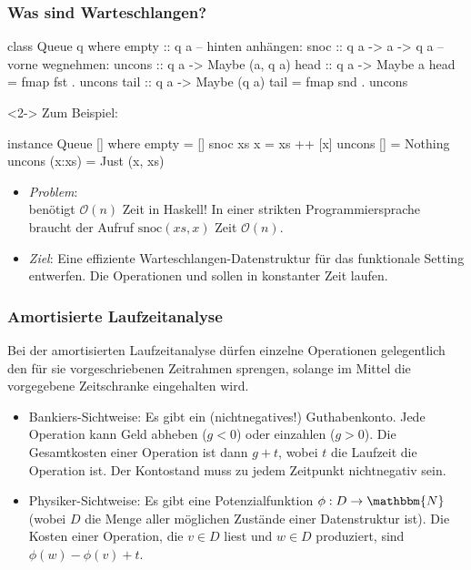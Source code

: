 \documentclass{beamer}
\renewcommand{\O}{\mathcal{O}} %
\newcommand{\N}{\mathbbm{N}} %
\begin{document}
\begin{frame}[fragile]
  \frametitle{Was sind Warteschlangen?}
  \begin{minipage}[t]{0.57 \linewidth}
\begin{haskellcode}
class Queue q where
  empty  :: q a
  -- hinten anhängen:
  snoc   :: q a -> a -> q a
  -- vorne wegnehmen:
  uncons :: q a -> Maybe (a, q a)
  head :: q a -> Maybe a
  head = fmap fst . uncons
  tail :: q a -> Maybe (q a)
  tail = fmap snd . uncons
\end{haskellcode}
  \end{minipage}
  \begin{minipage}[t]{0.4 \linewidth}
    \begin{visibleenv}<2->
    Zum Beispiel:
\begin{haskellcode}
instance Queue [] where
  empty = []
  snoc xs x = xs ++ [x]
  uncons []
    = Nothing
  uncons (x:xs)
    = Just (x, xs)
\end{haskellcode}
    \end{visibleenv}
  \end{minipage}
  
  \vspace{0.5cm}

  \begin{itemize}
    \item<3-> \emph{Problem}:
    { \centering {}} \\
    benötigt $\O(n)$ Zeit in Haskell! In einer strikten Programmiersprache braucht der Aufruf $\text{snoc}(xs, x)$ Zeit $\O(n)$.
    \item<4-> \emph{Ziel}: Eine effiziente Warteschlangen-Datenstruktur für das funktionale Setting entwerfen.
    Die Operationen  und  sollen in konstanter Zeit laufen.
  \end{itemize}
\end{frame}

\begin{frame}[fragile]
  \frametitle{Amortisierte Laufzeitanalyse}
  
  Bei der amortisierten Laufzeitanalyse dürfen einzelne Operationen gelegentlich den für sie vorgeschriebenen Zeitrahmen sprengen, solange im Mittel die vorgegebene Zeitschranke eingehalten wird.
  
  \begin{itemize}
    \item<2-> Bankiers-Sichtweise: Es gibt ein (nichtnegatives!) Guthabenkonto. Jede Operation kann Geld abheben ($g < 0$) oder einzahlen ($g > 0$). Die Gesamtkosten einer Operation ist dann $g + t$, wobei $t$ die Laufzeit die Operation ist. Der Kontostand muss zu jedem Zeitpunkt nichtnegativ sein.
    \item<3-> Physiker-Sichtweise: Es gibt eine Potenzialfunktion $\phi : D \to \N$ (wobei $D$ die Menge aller möglichen Zustände einer Datenstruktur ist). Die Kosten einer Operation, die $v \in D$ liest und $w \in D$ produziert, sind $\phi(w) - \phi(v) + t$.
  \end{itemize}
\end{frame}
\end{document}
